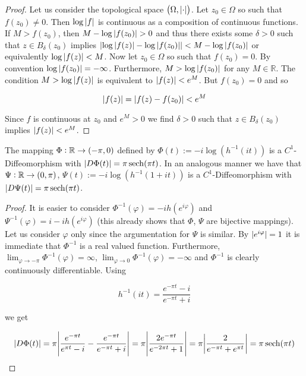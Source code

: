 \begin{proof}
	Let us consider the topological space $\del{ \Omega, \abs[0]{ \cdot}}$. Let $z_0 \in \Omega$ so such that $f(z_0) \neq 0$. Then $\log\abs[0]{ f}$ is continuous as a composition of continuous functions. If $M > f(z_0)$, then $M - \log\abs[0]{ f(z_0)} > 0$ and thus there exists some $\delta > 0$ such that $z \in B_\delta(z_0)$ implies $\abs[0]{ \log\abs[0]{ f(z)} - \log\abs[0]{ f(z_0)}} < M- \log\abs[0]{ f(z_0)}$ or equivalently $\log\abs[0]{ f(z)} < M$. Now let $z_0 \in \Omega$ so such that $f(z_0) = 0$. By convention $\log\abs[0]{ f(z_0)} = -\infty$. Furthermore, $M > \log\abs[0]{ f(z_0)}$ for any $M \in \mathbb{R}$. The condition $M > \log\abs[0]{ f(z)}$ is equivalent to $\abs[0]{ f(z)} < e^M$. But $f(z_0) = 0$ and so

	\begin{equation*}
		\abs[0]{ f(z)} = \abs[0]{ f(z) - f(z_0)}< e^M
	\end{equation*}

	Since $f$ is continuous at $z_0$ and $e^M > 0$ we find $\delta > 0$ such that $z \in B_\delta(z_0)$ implies $\abs[0]{ f(z)} < e^M$.
\end{proof}

\begin{lemma}
	The mapping $\Phi: \mathbb{R} \to \intoo{-\pi,0}$ defined by $\Phi(t) := -i\log( h^{-1}(it))$ is a $C^1$-Diffeomorphism with $\abs[0]{ D\Phi(t)} = \pi \sech(\pi t)$. In an analogous manner we have that $\Psi: \mathbb{R} \to \intoo{0,\pi}$, $\Psi(t) := -i\log( h^{-1}(1 + it) )$ is a $C^1$-Diffeomorphism with $\abs[0]{ D\Psi(t)} = \pi \sech(\pi t)$.
	\label{lem:change_of_variables}
\end{lemma}

\begin{proof}
	It is easier to consider $\Phi^{-1}(\varphi) = -i h(e^{i\varphi})$ and $\Psi^{-1}(\varphi) = i - i h(e^{i\varphi})$ (this already shows that $\Phi$, $\Psi$ are bijective mappings). Let us consider $\varphi$ only since the argumentation for $\Psi$ is similar. By $\abs[0]{ e^{i\varphi}} = 1$ it is immediate that $\Phi^{-1}$ is a real valued function. Furthermore, $\lim_{\varphi \to -\pi} \Phi^{-1}(\varphi) = \infty$, $\lim_{\varphi \rightarrow 0} \Phi^{-1}(\varphi) = -\infty$ and $\Phi^{-1}$ is clearly continuously differentiable. Using
	
	\begin{equation*}
		h^{-1}(it) = \frac{e^{-\pi t} - i}{e^{-\pi t} + i}
	\end{equation*}
	
	\noindent we get

	\begin{gather*}
		\abs[0]{ D\Phi(t)} = \pi\abs{ \frac{e^{-\pi t}}{e^{\pi t} - i} - \frac{e^{-\pi t}}{e^{-\pi t} + i}} = \pi\abs{ \frac{2e^{-\pi t}}{e^{-2\pi t} + 1}} = \pi \abs{ \frac{2}{e^{-\pi t} + e^{\pi t}}}= \pi \sech(\pi t)
	\end{gather*}
\end{proof}

